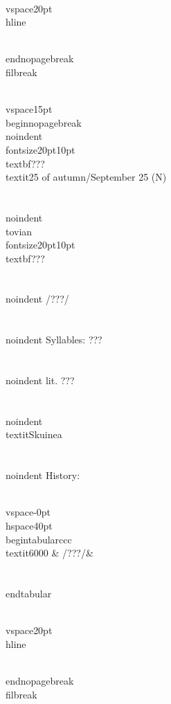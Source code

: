\\vspace{20pt}\\hline

\\end{nopagebreak}
\\filbreak



\\vspace{15pt}
\\begin{nopagebreak}
\\noindent{\\fontsize{20pt}{10pt}\\textbf{???} } \\textit{25 of autumn/September 25} (N)\\\\
\\noindent {\\tovian \\fontsize{20pt}{10pt} \\textbf{???} }\\\\
\\noindent /???/\\\\
\\noindent Syllables: ???\\\\
\\noindent lit. ???\\\\
\\noindent \\textit{Skuinea}\\\\


\\noindent History:

\\vspace{-0pt}
\\hspace{40pt}
\\begin{tabular}{ccc}
\\textit{6000} & /???/& \\\\
\\end{tabular}

\\vspace{20pt}\\hline

\\end{nopagebreak}
\\filbreak




